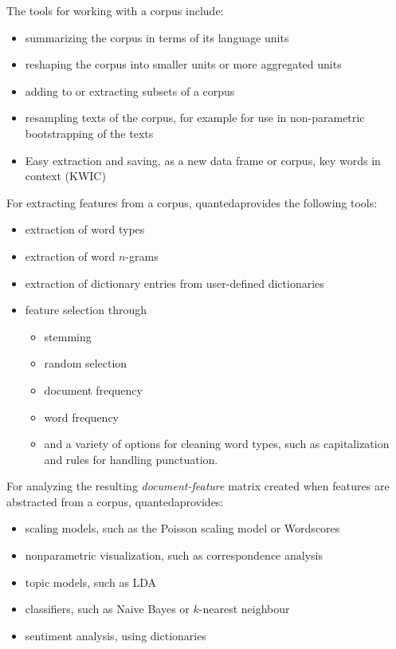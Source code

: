 \documentclass[11pt]{article}\usepackage[]{graphicx}\usepackage[]{color}
\newcommand{\quanteda}{\textsf{quanteda}}
\begin{document}
The tools for working with a corpus include:
\begin{itemize}
\item summarizing the corpus in terms of its language units
\item reshaping the corpus into smaller units or more aggregated units
\item adding to or extracting subsets of a corpus
\item resampling texts of the corpus, for example for use in
  non-parametric bootstrapping of the texts \citep[for an example, see][]{lowebenoitPA2013}
  \item Easy extraction and saving, as a new data frame or corpus, key
    words in context (KWIC)
\end{itemize}

For extracting features from a corpus, \quanteda provides the following tools:
\begin{itemize}
\item extraction of word types
\item extraction of word $n$-grams
\item extraction of dictionary entries from user-defined dictionaries
\item feature selection through
  \begin{itemize}
  \item stemming
  \item random selection
  \item document frequency
  \item word frequency
  \item and a variety of options for cleaning word types, such as
    capitalization and rules for handling punctuation.
  \end{itemize}
\end{itemize}

For analyzing the resulting \emph{document-feature} matrix created
when features are abstracted from a corpus, \quanteda provides:
\begin{itemize}
\item scaling models, such as the Poisson scaling model or Wordscores
\item nonparametric visualization, such as correspondence analysis
\item topic models, such as LDA
\item classifiers, such as Naive Bayes or $k$-nearest neighbour
\item sentiment analysis, using dictionaries
\end{itemize}
\end{document}
